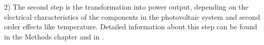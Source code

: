 2) The second step is the transformation into power output, depending on the electrical characteristics of the components in the photovoltaic system and second order effects like temperature. Detailed information about this step can be found in the Methods chapter and in \cite{Perpinan2009}.




